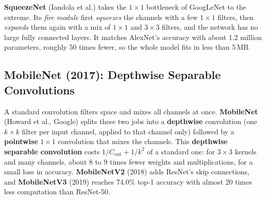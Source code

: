\documentclass[12pt, a4paper]{article}
\begin{document}
\textbf{SqueezeNet} (Iandola et al.) takes the $1\times1$ bottleneck of
GoogLeNet to the extreme. Its \emph{fire module} first \emph{squeezes} the
channels with a few $1\times1$ filters, then \emph{expands} them again with a
mix of $1\times1$ and $3\times3$ filters, and the network has no large fully
connected layers. It matches AlexNet's accuracy with about 1.2 million
parameters, roughly 50 times fewer, so the whole model fits in less than
5\,MB.

\subsection{MobileNet (2017): Depthwise Separable Convolutions}

A standard convolution filters space and mixes all channels at once.
\textbf{MobileNet} (Howard et al., Google) splits these two jobs into a
\textbf{depthwise} convolution (one $k \times k$ filter per input channel,
applied to that channel only) followed by a \textbf{pointwise} $1 \times 1$
convolution that mixes the channels. This \textbf{depthwise separable
  convolution} costs $1/C_{\text{out}} + 1/k^2$ of a standard one: for
$3 \times 3$ kernels and many channels, about 8 to 9 times fewer weights and
multiplications, for a small loss in accuracy. \textbf{MobileNetV2} (2018)
adds ResNet's skip connections, and \textbf{MobileNetV3} (2019) reaches 74.0\%
top-1 accuracy with almost 20 times less computation than ResNet-50.
\end{document}
